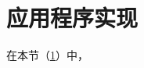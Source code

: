 \section{应用程序实现}\label{sec:ApplicationsImplementation}

在本节（\cref{sec:ApplicationsImplementation}）中，